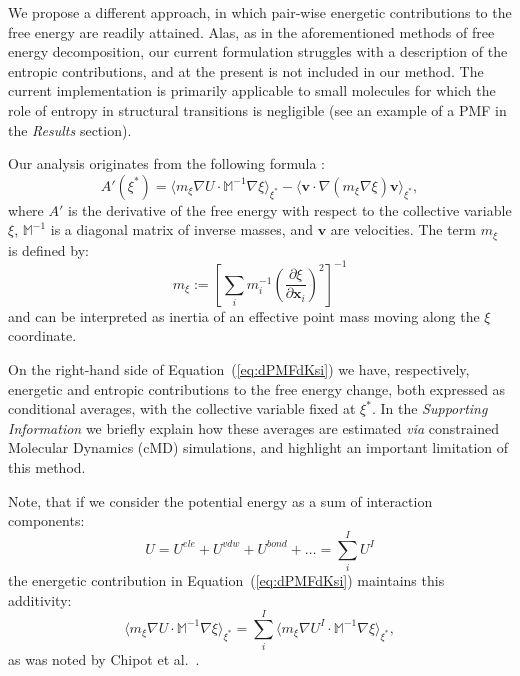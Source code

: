 \documentclass[a4paper,11pt,twoside]{book}%
\begin{document}
{\color{black}
We propose a different approach, in which pair-wise energetic contributions to the free energy are readily attained.
Alas, as in the aforementioned methods of free energy decomposition, our current formulation struggles with a description of the entropic contributions, and at the present is not included in our method.
The current implementation is primarily applicable to small molecules for which the role of entropy in structural transitions is negligible (see an example of a PMF in the \emph{Results} section).
}

Our analysis originates from the following formula \cite{carter1989constrained}:
\begin{equation}
\label{eq:dPMFdKsi}
A'(\xi^*)  =  \langle m_\xi \nabla U\cdot \mathbb{M}^{-1}\nabla\xi\rangle_{\xi^*}  - \langle \mathbf{v}\cdot\nabla(m_\xi\nabla\xi)\mathbf{v} \rangle_{\xi^*},
\end{equation}
where $A'$ is the derivative of the free energy with respect to the collective variable $\xi$, $\mathbb{M}^{-1}$ is a diagonal matrix of inverse masses, and $\mathbf{v}$ are velocities.
The term $m_\xi$ is defined by:
\begin{equation}
m_\xi := \left[ \sum_i m_i^{-1} \left(\frac{\partial\xi}{\partial\mathbf{x}_i}\right)^{2} \right]^{-1} 
\end{equation}
and can be interpreted as inertia of an effective point mass moving along the $\xi$ coordinate.

On the right-hand side of Equation~(\ref{eq:dPMFdKsi}) we have, respectively, energetic and entropic contributions to the free energy change, both expressed as conditional averages, with the collective variable fixed at $\xi^*$.
In the \emph{Supporting Information} we briefly explain how these averages are estimated \emph{via} constrained Molecular Dynamics (cMD) simulations, and highlight an important limitation of this method.

Note, that if we consider the potential energy as a sum of interaction components:
\begin{equation}
\nonumber U = U^{ele}+U^{vdw}+U^{bond}+\ldots =  \sum_{i}^I U^I 
\end{equation}
the  energetic contribution in Equation~(\ref{eq:dPMFdKsi}) maintains this additivity:
\begin{equation}
\langle m_\xi  \nabla U\cdot \mathbb{M}^{-1} \nabla\xi\rangle_{\xi^*} =  \sum_i^{I} \langle m_\xi \nabla U^I\cdot \mathbb{M}^{-1}\nabla\xi\rangle_{\xi^*} ,
\end{equation}
as was noted by Chipot et al.~\cite{chipot2007free}.
\end{document}
